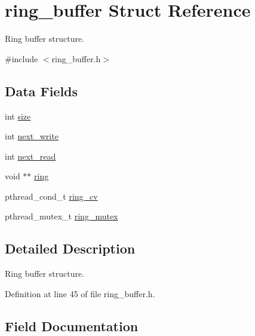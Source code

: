 \hypertarget{structring__buffer}{}\section{ring\+\_\+buffer Struct Reference}
\label{structring__buffer}


Ring buffer structure.  




{\ttfamily \#include $<$ring\+\_\+buffer.\+h$>$}

\subsection*{Data Fields}
\begin{DoxyCompactItemize}
\item 
int \hyperlink{structring__buffer_a0d2f79fe70794fc16c8536b06bff7894}{size}
\item 
int \hyperlink{structring__buffer_af3f14937423dc6d693444d550b498c12}{next\+\_\+write}
\item 
int \hyperlink{structring__buffer_ad905e08b794b74cc49d585bec2e08776}{next\+\_\+read}
\item 
void $\ast$$\ast$ \hyperlink{structring__buffer_a9c694810d59531a5725341dc33d02445}{ring}
\item 
pthread\+\_\+cond\+\_\+t \hyperlink{structring__buffer_add8eae2fb8095b3a680d40f77e4ccf14}{ring\+\_\+cv}
\item 
pthread\+\_\+mutex\+\_\+t \hyperlink{structring__buffer_a02f5f67c7cfb2d9af345d3b2a4763706}{ring\+\_\+mutex}
\end{DoxyCompactItemize}


\subsection{Detailed Description}
Ring buffer structure. 

Definition at line 45 of file ring\+\_\+buffer.\+h.



\subsection{Field Documentation}
\hypertarget{structring__buffer_ad905e08b794b74cc49d585bec2e08776}{}\label{structring__buffer_ad905e08b794b74cc49d585bec2e08776} 
